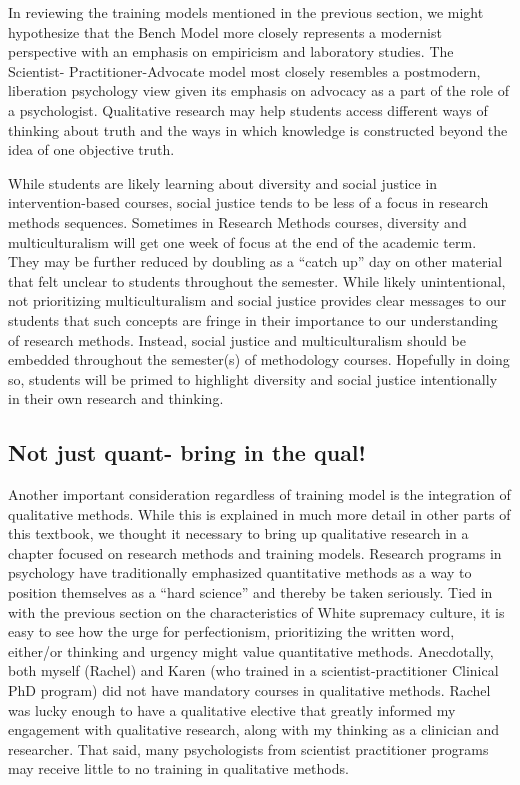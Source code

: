\documentclass[
  11pt,
]{book}
\begin{document}
In reviewing the training models mentioned in the previous section, we might hypothesize that the Bench Model more closely represents a modernist perspective with an emphasis on empiricism and laboratory studies. The Scientist- Practitioner-Advocate model most closely resembles a postmodern, liberation psychology view given its emphasis on advocacy as a part of the role of a psychologist. Qualitative research may help students access different ways of thinking about truth and the ways in which knowledge is constructed beyond the idea of one objective truth.

While students are likely learning about diversity and social justice in intervention-based courses, social justice tends to be less of a focus in research methods sequences. Sometimes in Research Methods courses, diversity and multiculturalism will get one week of focus at the end of the academic term. They may be further reduced by doubling as a ``catch up'' day on other material that felt unclear to students throughout the semester. While likely unintentional, not prioritizing multiculturalism and social justice provides clear messages to our students that such concepts are fringe in their importance to our understanding of research methods. Instead, social justice and multiculturalism should be embedded throughout the semester(s) of methodology courses. Hopefully in doing so, students will be primed to highlight diversity and social justice intentionally in their own research and thinking.

\subsection{Not just quant- bring in the qual!}\label{not-just-quant--bring-in-the-qual}

Another important consideration regardless of training model is the integration of qualitative methods. While this is explained in much more detail in other parts of this textbook, we thought it necessary to bring up qualitative research in a chapter focused on research methods and training models. Research programs in psychology have traditionally emphasized quantitative methods as a way to position themselves as a ``hard science'' and thereby be taken seriously. Tied in with the previous section on the characteristics of White supremacy culture, it is easy to see how the urge for perfectionism, prioritizing the written word, either/or thinking and urgency might value quantitative methods. Anecdotally, both myself (Rachel) and Karen (who trained in a scientist-practitioner Clinical PhD program) did not have mandatory courses in qualitative methods. Rachel was lucky enough to have a qualitative elective that greatly informed my engagement with qualitative research, along with my thinking as a clinician and researcher. That said, many psychologists from scientist practitioner programs may receive little to no training in qualitative methods.
\end{document}
